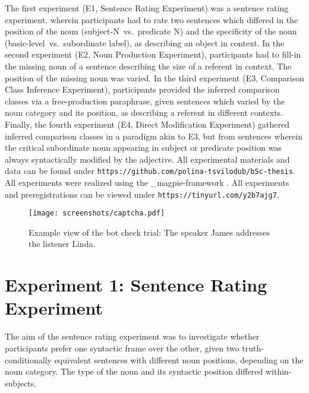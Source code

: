 The first experiment (E1, Sentence Rating Experiment) was a sentence rating experiment, wherein participants had to rate two sentences which differed in the position of the noun (subject-N~vs.~predicate N) and the specificity of the noun (basic-level~vs.~subordinate label), as describing an object in context. 
In the second experiment (E2, Noun Production Experiment), participants had to fill-in the missing noun of a sentence describing the size of a referent in context. The position of the missing noun was varied. 
In the third experiment (E3, Comparison Class Inference Experiment), participants provided the inferred comparison classes via a free-production paraphrase, given sentences which varied by the noun category and its position, as describing a referent in different contexts. 
Finally, the fourth experiment (E4, Direct Modification Experiment) gathered inferred comparison classes in a paradigm akin to E3, but from sentences wherein the critical subordinate noun appearing in subject or predicate position was always syntactically modified by the adjective. 
All experimental materials and data can be found under \texttt{https://github.com/polina-tsvilodub/bSc-thesis}. All experiments were realized using the \_magpie-framework \parencite{magpie}. 
All experiments and preregistrations can be viewed under \texttt{https://tinyurl.com/y2b7ajg7}. %
\begin{figure*}[t]
	\begin{center}
		\texttt{[image: screenshots/captcha.pdf]}
	\end{center}
	\vspace{-1.5cm}
	\caption{Example view of the bot check trial: The speaker James addresses the listener Linda.}
	\label{captcha}
\end{figure*}

\section{Experiment 1: Sentence Rating Experiment}

The aim of the sentence rating experiment was to investigate whether participants prefer one syntactic frame over the other, given two truth-conditionally equivalent sentences with different noun positions, depending on the noun category. The type of the noun and its syntactic position differed within-subjects.

